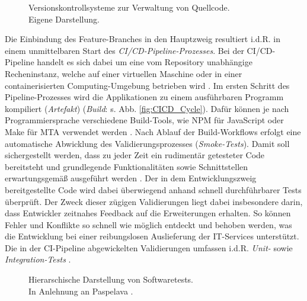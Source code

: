 \begin{center}
	\begin{figure}[H]
		\centering
		\caption[Versionskontrollsysteme zur Verwaltung von Quellcode]{Versionskontrollsysteme zur Verwaltung von Quellcode.\\ Eigene Darstellung.}
		\label{fig:VCS}
	\end{figure}
\end{center}
\vspace*{-10mm}
Die Einbindung des Feature-Branches in den Hauptzweig resultiert i.d.R. in einem unmittelbaren Start des \textit{CI/CD-Pipeline-Prozesses}. Bei der CI/CD-Pipeline handelt es sich dabei um eine vom Repository unabhängige Recheninstanz, welche auf einer virtuellen Maschine oder in einer containerisierten Computing-Umgebung betrieben wird \cite[Kap. 1.2]{Labouardy.2021}. Im ersten Schritt des Pipeline-Prozesses wird die Applikationen zu einem ausführbaren Programm kompiliert (\textit{Artefakt}) (\textit{Build}: s. Abb. \ref*{fig:CICD_Cycle}). Dafür können je nach Programmiersprache verschiedene Build-Tools, wie NPM für JavaScript oder Make für \ac{MTA} verwendet werden \cite[Kap. 7.1]{Labouardy.2021}. Nach Ablauf der Build-Workflows erfolgt eine automatische Abwicklung des Validierungsprozesses (\textit{Smoke-Tests}). Damit soll sichergestellt werden, dass zu jeder Zeit ein rudimentär getesteter Code bereitsteht und grundlegende Funktionalitäten sowie Schnittstellen erwartungsgemäß ausgeführt werden \cite[19]{Halstenberg.2020}. Der in dem Entwicklungszweig bereitgestellte Code wird dabei überwiegend anhand schnell durchführbarer Tests überprüft. Der Zweck dieser zügigen Validierungen liegt dabei insbesondere darin, dass Entwickler zeitnahes Feedback auf die Erweiterungen erhalten. So können Fehler und Konflikte so schnell wie möglich entdeckt und behoben werden, was die Entwicklung bei einer reibungslosen Auslieferung der IT-Services unterstützt. Die in der CI-Pipeline abgewickelten Validierungen umfassen i.d.R. \textit{Unit-} sowie \textit{Integration-Tests} \cite[Kap. 1.2]{Labouardy.2021}.
\begin{center}
	\begin{figure}[H]
		\centering
		\caption[Hierarschische Darstellung von Softwaretests]{Hierarschische Darstellung von Softwaretests.\\ \hspace{0.5cm}In Anlehnung an Paspelava \cite{Exposit.2021}.}
		\label{fig:Tests}
	\end{figure}
\end{center}
